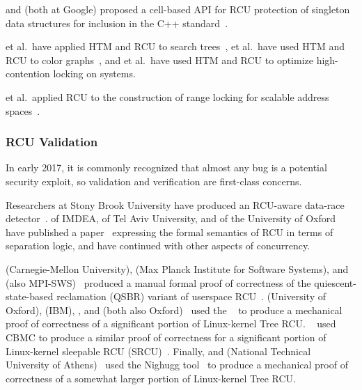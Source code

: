  and  (both at Google) proposed
a cell-based API for RCU
protection of singleton data structures for inclusion in the
C++ standard~\cite{GeoffRomer2018C++DeferredReclamationP0561R4}.

 et al.~have applied
HTM and RCU to search trees~\cite{Siakavaras2017CombiningHA,DimitriosSiakavaras2020RCU-HTM-B+Trees},
 et al.~have used HTM and RCU to color
graphs~\cite{ChristinaGiannoula2018HTM-RCU-graphcoloring},
and
 et al.~have used HTM and RCU to optimize high-contention
locking on  systems.

 et al.~applied RCU to the construction of range locking
for scalable address spaces~\cite{AlexKogan2020RCUrangelocks}.

\subsubsection{RCU Validation}
\label{sec:defer:RCU Validation}

In early 2017, it is commonly recognized that almost any bug is a potential
security exploit, so validation and verification are first-class concerns.

Researchers at Stony Brook University have produced an RCU-aware data-race
detector~\cite{AbhinavDuggal2010Masters,JustinSeyster2012PhD,Seyster:2011:RFA:2075416.2075425}.
 of IMDEA,  of Tel Aviv University,
and  of the University of Oxford have published a
paper~\cite{AlexeyGotsman2012VerifyGraceExtended} expressing the formal
semantics of RCU in terms of separation logic, and have continued with
other aspects of concurrency.

 (Carnegie-Mellon University),  (Max
Planck Institute for Software Systems), and 
(also MPI-SWS)~\cite{JosephTassarotti2015RCUproof}
produced a manual formal proof of correctness of the quiescent-state-based
reclamation (QSBR) variant of userspace
RCU~\cite{MathieuDesnoyers2009URCU,MathieuDesnoyers2012URCU}.
 (University of Oxford),  (IBM),
, and 
(both also Oxford)~\cite{LihaoLiang2016VerifyTreeRCU}
used the ~\cite{EdmundClarke2004CBMC}
to produce a mechanical proof of correctness of a significant portion
of Linux-kernel Tree RCU\@.
~\cite{LanceRoy2017CBMC-SRCU} used CBMC to produce a similar
proof of correctness for a significant portion of Linux-kernel
sleepable RCU (SRCU)~\cite{PaulEMcKenney2006c}.
Finally,  and 
(National Technical University of
Athens)~\cite{MichalisKokologiannakis2017NidhuggRCU,MichalisKokologiannakis2019RCUstatelessModelCheck}
used the Nighugg tool~\cite{CarlLeonardsson2014Nidhugg}
to produce a mechanical proof of correctness of a somewhat larger
portion of Linux-kernel Tree RCU\@.

